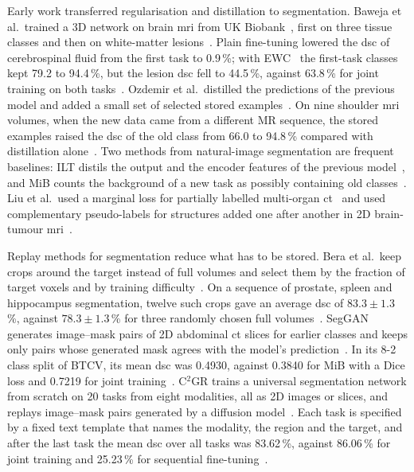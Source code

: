 Early work transferred regularisation and distillation to segmentation.
Baweja et al.\ trained a 3D network on brain \gls{mri} from UK Biobank~\cite{ukbiobank}, first on three tissue classes and then on white-matter lesions~\cite{baweja2018continuallearningmedicalimaging}.
Plain fine-tuning lowered the \gls{dsc} of cerebrospinal fluid from the first task to 0.9\,\%; with EWC~\cite{Kirkpatrick_2017} the first-task classes kept 79.2 to 94.4\,\%, but the lesion \gls{dsc} fell to 44.5\,\%, against 63.8\,\% for joint training on both tasks~\cite{baweja2018continuallearningmedicalimaging}.
Ozdemir et al.\ distilled the predictions of the previous model and added a small set of selected stored examples~\cite{Ozdemir_2018}.
On nine shoulder \gls{mri} volumes, when the new data came from a different MR sequence, the stored examples raised the \gls{dsc} of the old class from 66.0 to 94.8\,\% compared with distillation alone~\cite{Ozdemir_2018}.
Two methods from natural-image segmentation are frequent baselines: ILT distils the output and the encoder features of the previous model~\cite{michieli2019incrementallearningtechniquessemantic}, and MiB counts the background of a new task as possibly containing old classes~\cite{cermelli2020modelingbackgroundincrementallearning}.
Liu et al.\ used a marginal loss for partially labelled multi-organ \gls{ct}~\cite{liu2022learningincrementallysegmentmultiple} and used complementary pseudo-labels for structures added one after another in 2D brain-tumour \gls{mri}~\cite{liu2023incrementallearningheterogeneousstructure}.

Replay methods for segmentation reduce what has to be stored.
Bera et al.\ keep crops around the target instead of full volumes and select them by the fraction of target voxels and by training difficulty~\cite{memory_replay_cropping}.
On a sequence of prostate, spleen and hippocampus segmentation, twelve such crops gave an average \gls{dsc} of $83.3 \pm 1.3$\,\%, against $78.3 \pm 1.3$\,\% for three randomly chosen full volumes~\cite{memory_replay_cropping}.
SegGAN generates image--mask pairs of 2D abdominal \gls{ct} slices for earlier classes and keeps only pairs whose generated mask agrees with the model's prediction~\cite{newgenerativereplayapproach}.
In its 8-2 class split of BTCV, its mean \gls{dsc} was 0.4930, against 0.3840 for MiB with a Dice loss and 0.7219 for joint training~\cite{newgenerativereplayapproach}.
C$^2$GR trains a universal segmentation network from scratch on 20 tasks from eight modalities, all as 2D images or slices, and replays image--mask pairs generated by a diffusion model~\cite{li2026c2gr}.
Each task is specified by a fixed text template that names the modality, the region and the target, and after the last task the mean \gls{dsc} over all tasks was 83.62\,\%, against 86.06\,\% for joint training and 25.23\,\% for sequential fine-tuning~\cite{li2026c2gr}.

